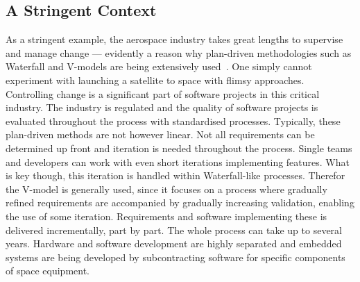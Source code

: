 \documentclass[english]{tktltiki2}
\begin{document}
\subsection{A Stringent Context}

As a stringent example, the aerospace industry takes great lengths to supervise and manage change — evidently a reason why plan-driven methodologies such as Waterfall and V-models are being extensively used~\cite{Hol15b}. One simply cannot experiment with launching a satellite to space with flimsy approaches. Controlling change is a significant part of software projects in this critical industry. The industry is regulated and the quality of software projects is evaluated throughout the process with standardised processes. Typically, these plan-driven methods are not however linear. Not all requirements can be determined up front and iteration is needed throughout the process. Single teams and developers can work with even short iterations implementing features. What is key though, this iteration is handled within Waterfall-like processes. Therefor the V-model is generally used, since it focuses on a process where gradually refined requirements are accompanied by gradually increasing validation, enabling the use of some iteration. Requirements and software implementing these is delivered incrementally, part by part. The whole process can take up to several years. Hardware and software development are highly separated and embedded systems are being developed by subcontracting software for specific components of space equipment.
\end{document}
